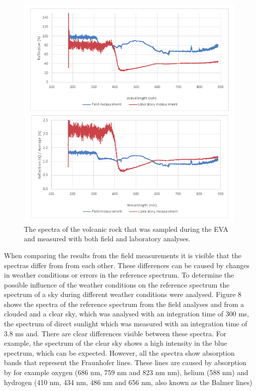 \documentclass[preprint]{elsarticle}
\begin{document}
\begin{figure}
\centering
\includegraphics{img/figure07.png}
\caption{The spectra of the volcanic rock that was sampled during the EVA and measured with both field and laboratory analyses.}
\end{figure}

When comparing the results from the field measurements it is visible that the spectras differ from from each other. These differences can be caused by changes in weather conditions or errors in the reference spectrum. To determine the possible influence of the weather conditions on the reference spectrum the spectrum of a sky during different weather conditions were analysed. Figure 8 shows the spectra of the reference spectrum from the field analyses and from a clouded and a clear sky, which was analysed with an integration time of 300 ms, the spectrum of direct sunlight which was measured with an integration time of 3.8 ms and. There are clear differences visible between these spectra. For example, the spectrum of the clear sky shows a high intensity in the blue spectrum, which can be expected. However, all the spectra show absorption bands that represent the Fraunhofer lines. These lines are caused by absorption by for example oxygen (686 nm, 759 nm and 823 nm nm), helium (588 nm) and hydrogen (410 nm, 434 nm, 486 nm and 656 nm, also known as the Balmer lines)
\end{document}
